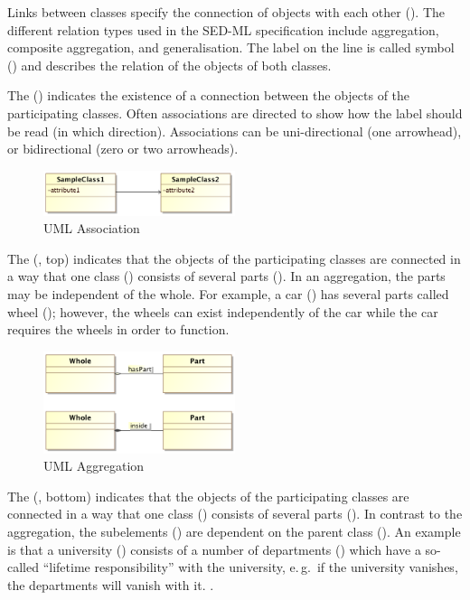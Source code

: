 Links between classes specify the connection of objects with each other (). The different relation types used in the SED-ML specification include aggregation, composite aggregation, and generalisation. The label on the line is called symbol () and describes the relation of the objects of both classes. 

The  () indicates the existence of a connection between the objects of the participating classes. Often associations are directed to show how the label should be read (in which direction). Associations can be uni-directional (one arrowhead), or bidirectional (zero or two arrowheads). 
\begin{figure}[h]
\centering
\includegraphics[width=0.5\textwidth]{images/uml/umlAssociation.png}
\caption{UML Association}
\label{fig:umlAssociation}
\end{figure}

 
The  (, top) indicates that the objects of the participating classes are connected in a way that one class () consists of several parts (). In an aggregation, the parts may be independent of the whole. For example, a car ()  has several parts called wheel (); however, the wheels can exist independently of the car while the car requires the wheels in order to function.
\begin{figure}[h]
\centering
\includegraphics[width=0.5\textwidth]{images/uml/umlAggregation.png}
\caption{UML Aggregation}
\label{fig:umlAggregation}
\end{figure}

The  (, bottom) indicates that the objects of the participating classes are connected in a way that one class () consists of several parts (). In contrast to the aggregation, the subelements () are dependent on the parent class (). An example is that a university () consists of a number of departments () which have a so-called ``lifetime responsibility'' with the university, e.\,g.\ if the university vanishes,  the departments will vanish with it. \citep{Bel03}.

